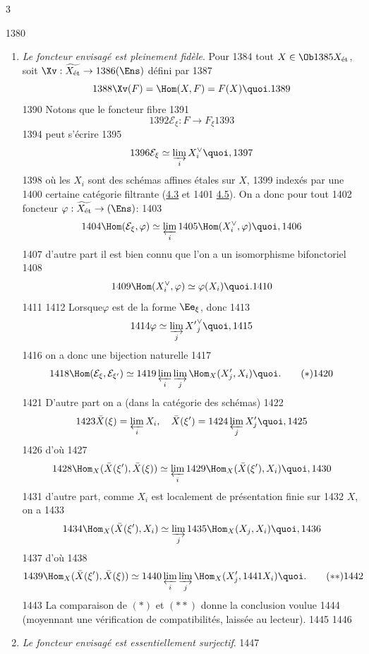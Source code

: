 3	\documentclass[10pt]{../fichiers-configuration-latex/smfart}
\begin{document}
  1380	\begin{enumerate}
  1381	\renewcommand{\theenumi}{\alph{enumi}}
  1382	\renewcommand{\labelenumi}{\theenumi)}
  1383	\item \emph{Le foncteur envisagé est pleinement fidèle}. Pour
  1384	  tout $X \in \Ob
  1385	  X_{\text{ét}}$, soit $\Xv : \widetilde{X_{\text{ét}}} \to
  1386	  (\Ens)$ défini par
  1387	$$
  1388	\Xv (F) = \Hom(X, F) = F(X){\quoi}.
  1389	$$
  1390	Notons que le foncteur fibre
  1391	$$
  1392	\mathcal{E}_{\xi} : F \to F_{\xi}
  1393	$$
  1394	peut s'écrire
  1395	$$
  1396	\mathcal{E}_{\xi} \simeq \varinjlim_i X^{\vee}_i{\quoi},
  1397	$$
  1398	où les $X_i$ sont des schémas affines étales sur $X$,
  1399	indexés par une
  1400	certaine catégorie filtrante (\cf \hyperref[VIII.def4.3]{4.3} et
  1401	\hyperref[VIII.subsec4.5]{4.5}). On a donc pour tout
  1402	foncteur $\varphi : \widetilde{X_{\text{ét}}} \to (\Ens)$:
  1403	$$
  1404	\Hom(\mathcal{E}_{\xi}, \varphi) \simeq \varprojlim_{i}
  1405	\Hom(X^{\vee}_i, \varphi){\quoi},
  1406	$$
  1407	d'autre part il est bien connu que l'on a un isomorphisme bifonctoriel
  1408	$$
  1409	\Hom(X^{\vee}_i, \varphi) \simeq \varphi (X_i){\quoi}.
  1410	$$
  1411	
  1412	Lorsque\pageoriginale $\varphi$ est de la forme $\Ee_{\xi}$, donc
  1413	$$
  1414	\varphi \simeq \varinjlim_j {X'}_j^{\vee}{\quoi},
  1415	$$
  1416	on a donc une bijection naturelle
  1417	\begin{equation*}
  1418	\Hom (\mathcal{E}_{\xi}, \mathcal{E}_{\xi'}) \simeq
  1419	\varprojlim_{i} \varinjlim_{j} \Hom_X (X'_j, X_i){\quoi}.\tag{$\ast$}
  1420	\end{equation*}
  1421	D'autre part on a (dans la catégorie des schémas)
  1422	$$
  1423	\bar{X}(\xi) = \varprojlim_{i} X_i,\quad \bar{X} (\xi') =
  1424	\varprojlim_{j} X'_j{\quoi},
  1425	$$
  1426	d'où
  1427	$$
  1428	\Hom_{X} (\bar{X} (\xi'), \bar{X}(\xi)) \simeq \varprojlim_{i}
  1429	\Hom_X (\bar{X} (\xi'), X_i){\quoi},
  1430	$$
  1431	d'autre part, comme $X_i$ est localement de présentation finie sur
  1432	$X$, on a
  1433	$$
  1434	\Hom_X (\bar{X} (\xi'), X_i) \simeq \varinjlim_{j}
  1435	\Hom_X (X_j, X_i){\quoi},
  1436	$$
  1437	d'où
  1438	\begin{equation*}
  1439	\Hom_X (\bar{X} (\xi'), \bar{X} (\xi) ) \simeq
  1440	\varprojlim_{i} \varinjlim_{j} \Hom_X (X'_j,
  1441	X_i){\quoi}.\tag{${\ast}{\ast}$}
  1442	\end{equation*}
  1443	La comparaison de $(\ast)$ et $({\ast}{\ast})$ donne la conclusion voulue
  1444	(moyennant une vérification de compatibilités, laissée au lecteur).
  1445	
  1446	\item \emph{Le foncteur envisagé est essentiellement surjectif}.
  1447	\end{enumerate}
\end{document}
